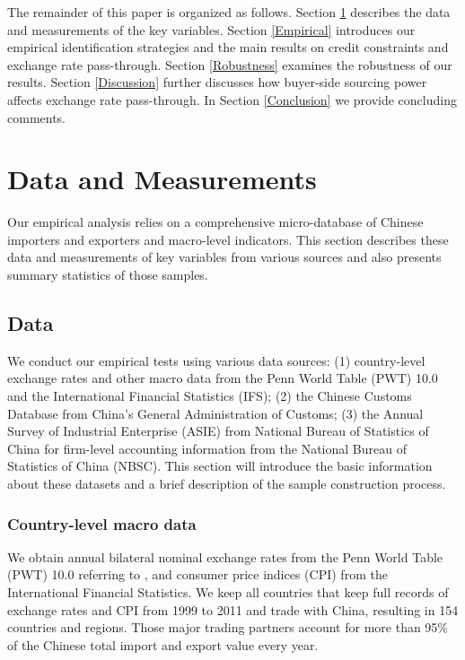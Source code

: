 \documentclass[12pt]{article}
\begin{document}
The remainder of this paper is organized as follows. Section \ref{Data&Measurements} describes the data and measurements of the key variables. Section \ref{Empirical} introduces our empirical identification strategies and the main results on credit constraints and exchange rate pass-through. Section \ref{Robustness} examines the robustness of our results.  Section \ref{Discussion} further discusses how buyer-side sourcing power affects exchange rate pass-through. In Section \ref{Conclusion} we provide concluding comments.

\section{Data and Measurements} \label{Data&Measurements}

Our empirical analysis relies on a comprehensive micro-database of Chinese importers and exporters and macro-level indicators. This section describes these data and measurements of key variables from various sources and also presents summary statistics of those samples.

\subsection{Data} \label{Data}

We conduct our empirical tests using various data sources: (1) country-level exchange rates and other macro data from the Penn World Table (PWT) 10.0 and the International Financial Statistics (IFS); (2) the Chinese Customs Database from China’s General Administration of Customs; (3) the Annual Survey of Industrial Enterprise (ASIE) from National Bureau of Statistics of China for firm-level accounting information from the National Bureau of Statistics of China (NBSC). This section will introduce the basic information about these datasets and a brief description of the sample construction process.

\subsubsection{Country-level macro data} \label{Data-Macro}

We obtain annual bilateral nominal exchange rates from the Penn World Table (PWT) 10.0 referring to \cite{feenstra2015}, and consumer price indices (CPI) from the International Financial Statistics. We keep all countries that keep full records of exchange rates and CPI from 1999 to 2011 and trade with China, resulting in 154 countries and regions. Those major trading partners account for more than 95\% of the Chinese total import and export value every year.
\end{document}
